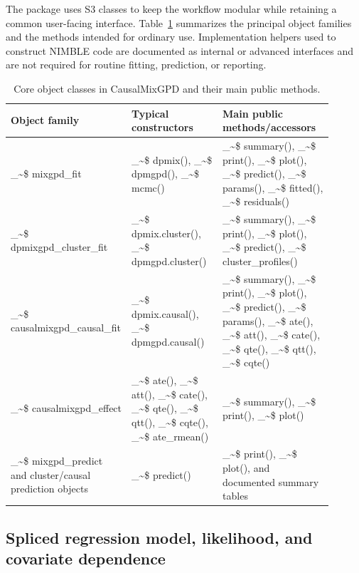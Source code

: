 \documentclass[preprint,12pt,authoryear]{elsarticle}
\makeatletter
\newcommand{\pkg}[1]{\textsf{#1}}
\newcommand\code{\bgroup\@makeother\_\@makeother\~\@makeother\$\@codex}
\def\@codex#1{{\normalfont\ttfamily\hyphenchar\font=-1 #1}\egroup}
\makeatother
\begin{document}
The package uses S3 classes to keep the workflow modular while
retaining a common user-facing interface.  Table~\ref{tab:class-overview}
summarizes the principal object families and the methods intended for
ordinary use.  Implementation helpers used to construct NIMBLE code are
documented as internal or advanced interfaces and are not required for
routine fitting, prediction, or reporting.

\begin{table}[!htbp]
\centering
\small
\caption[Core object classes in \pkg{CausalMixGPD}]{Core object
  classes in \pkg{CausalMixGPD} and their main public methods.}
\label{tab:class-overview}
{
\renewcommand{\arraystretch}{1.08}
\begin{tabular}{
  @{}>{\raggedright\arraybackslash}p{0.28\linewidth}
  >{\raggedright\arraybackslash}p{0.28\linewidth}
  >{\raggedright\arraybackslash}p{0.34\linewidth}@{}
}
\toprule
Object family & Typical constructors & Main public methods/accessors \\
\midrule
\code{mixgpd\_fit} & \code{dpmix()}, \code{dpmgpd()}, \code{mcmc()} &
  \code{summary()}, \code{print()}, \code{plot()}, \code{predict()},
  \code{params()}, \code{fitted()}, \code{residuals()} \\
\code{dpmixgpd\_cluster\_fit} & \code{dpmix.cluster()},
  \code{dpmgpd.cluster()} &
  \code{summary()}, \code{print()}, \code{plot()}, \code{predict()},
  \code{cluster\_profiles()} \\
\code{causalmixgpd\_causal\_fit} & \code{dpmix.causal()},
  \code{dpmgpd.causal()} &
  \code{summary()}, \code{print()}, \code{plot()}, \code{predict()},
  \code{params()}, \code{ate()}, \code{att()}, \code{cate()},
  \code{qte()}, \code{qtt()}, \code{cqte()} \\
\code{causalmixgpd\_effect} & \code{ate()}, \code{att()}, \code{cate()},
  \code{qte()}, \code{qtt()}, \code{cqte()}, \code{ate\_rmean()} &
  \code{summary()}, \code{print()}, \code{plot()} \\
\code{mixgpd\_predict} and cluster/causal prediction objects &
  \code{predict()} &
  \code{print()}, \code{plot()}, and documented summary tables \\
\bottomrule
\end{tabular}
}
\end{table}

\subsection{Spliced regression model, likelihood, and covariate dependence}
\label{subsec:overview-model}
\end{document}
